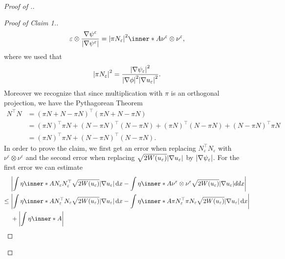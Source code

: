\begin{proof}[Proof of .]
\begin{proof}[Proof of Claim 1.]
\begin{align*}
{{{{			\varepsilon } } } \otimes \frac{ \nabla \psi^{ \varepsilon } }{ 
			\abs{ \nabla \psi^{ \varepsilon } } } }
			= 
			\abs{ \pi N_{ \varepsilon } }^{ 2 }
			\inner*{ A }{ \nu^{ \varepsilon } \otimes \nu^{ \varepsilon } },
		\end{align*}
		where we used that 
		\begin{equation*}
			\abs{ \pi N_{ \varepsilon } }^{ 2 }
			=
			\frac{ \abs{ \nabla \psi_{ \varepsilon } }^{ 2 } }{ \abs{ \nabla 
			\phi }^{ 2 } \abs{ \nabla u_{ \varepsilon } }^{ 2 } }.
		\end{equation*}
		Moreover we recognize that since multiplication with $ \pi $ is 
		an orthogonal projection, we have the Pythagorean Theorem
		\begin{align*}
			N^{ \top } N 
			& =
			( \pi N + N - \pi N )^{ \top } ( \pi N + N - \pi N )
			\\
			& =
			( \pi N )^{ \top } \pi N 
			+
			( N - \pi N )^{ \top } ( N - \pi N )
			+
			( \pi N )^{ \top } ( N - \pi N )
			+
			( N - \pi N )^{ \top } \pi N 
			\\
			& =
			( \pi N )^{ \top } \pi N
			+
			( N - \pi N )^{ \top } ( N - \pi N ).
		\end{align*}
		In order to prove the claim, we first get an error when replacing $ N_{ 
		\varepsilon }^{ \top } N_{ \varepsilon } $ with $ \nu^{ \varepsilon } 
		\otimes \nu^{ \varepsilon } $ and the second error when replacing $ 
		\sqrt{ 2 W ( u_{ \varepsilon } ) } \abs{ \nabla u_{ \varepsilon } } $ 
		by $ \abs{ \nabla \psi_{ \varepsilon } } $.
		For the first error we can estimate
		\begin{align*}
			& \abs{ 
				\int
					\eta 
					\inner*{ A }{ N_{ \varepsilon } N_{ \varepsilon }^{ \top } }
					\sqrt{ 2 W ( u_{ \varepsilon } ) } \abs{ \nabla u_{ 
					\varepsilon } }
				\dd{ x }
				-
				\int
					\eta
					\inner*{ A }{ \nu^{ \varepsilon } \otimes \nu^{ \varepsilon 
					} }
					\sqrt{ 2 W ( u_{ \varepsilon } ) } \abs{ \nabla u_{ 
					\varepsilon } }
				dd{ x }
			}
			\\
			\leq{} &
			\abs{ 
				\int
					\eta 
					\inner*{ A }{ N_{ \varepsilon }^{ \top } N_{ \varepsilon } }
					\sqrt{ 2 W ( u_{ \varepsilon } ) } \abs{ \nabla u_{ 
					\varepsilon } } 
				\dd{ x }
				-
				\int 
					\eta
					\inner*{ A }
					{ \pi N_{ \varepsilon }^{ \top } \pi N_{ \varepsilon } }
					\sqrt{ 2 W ( u_{ \varepsilon } ) }
					\abs{ \nabla u_{ \varepsilon } }
				\dd{ x }
			}
			\\
			& + 
			\abs{ 
				\int
					\eta
					\inner*{ A }
}
\end{align*}
\end{proof}
\end{proof}
